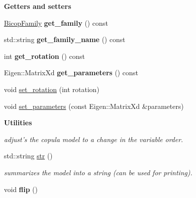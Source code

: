 \begin{Indent}{\bf Getters and setters}\par
\begin{DoxyCompactItemize}
\item 
\hypertarget{classvinecopulib_1_1_bicop_a68ab3556ee3bb3d02814fd978573bf3b}{\hyperlink{namespacevinecopulib_a42e95cc06d33896199caab0c11ad44f3}{Bicop\+Family} {\bfseries get\+\_\+family} () const }\label{classvinecopulib_1_1_bicop_a68ab3556ee3bb3d02814fd978573bf3b}

\item 
\hypertarget{classvinecopulib_1_1_bicop_a4d4fbc0fdca17564c23f4814d5d2fbe7}{std\+::string {\bfseries get\+\_\+family\+\_\+name} () const }\label{classvinecopulib_1_1_bicop_a4d4fbc0fdca17564c23f4814d5d2fbe7}

\item 
\hypertarget{classvinecopulib_1_1_bicop_ab8e52577a50fbfc57277f9240d8eac03}{int {\bfseries get\+\_\+rotation} () const }\label{classvinecopulib_1_1_bicop_ab8e52577a50fbfc57277f9240d8eac03}

\item 
\hypertarget{classvinecopulib_1_1_bicop_a93ab0dd89826e50b209ea3760f251f2f}{Eigen\+::\+Matrix\+Xd {\bfseries get\+\_\+parameters} () const }\label{classvinecopulib_1_1_bicop_a93ab0dd89826e50b209ea3760f251f2f}

\item 
void \hyperlink{classvinecopulib_1_1_bicop_a4e359624560a089273b25dc74879bd16}{set\+\_\+rotation} (int rotation)
\item 
void \hyperlink{classvinecopulib_1_1_bicop_ac8d1d4266b0fd7e2f971d0149f881ef9}{set\+\_\+parameters} (const Eigen\+::\+Matrix\+Xd \&parameters)
\end{DoxyCompactItemize}
\end{Indent}
\begin{Indent}{\bf Utilities}\par
{\em adjust's the copula model to a change in the variable order. }\begin{DoxyCompactItemize}
\item 
\hypertarget{classvinecopulib_1_1_bicop_a94b889d56f478dbeb156be4e31af5de5}{std\+::string \hyperlink{classvinecopulib_1_1_bicop_a94b889d56f478dbeb156be4e31af5de5}{str} ()}\label{classvinecopulib_1_1_bicop_a94b889d56f478dbeb156be4e31af5de5}

\begin{DoxyCompactList}\small\item\em summarizes the model into a string (can be used for printing). \end{DoxyCompactList}\item 
\hypertarget{classvinecopulib_1_1_bicop_a59b7087b3857350df25ff684ab96f377}{void {\bfseries flip} ()}\label{classvinecopulib_1_1_bicop_a59b7087b3857350df25ff684ab96f377}

\end{DoxyCompactItemize}
\end{Indent}


